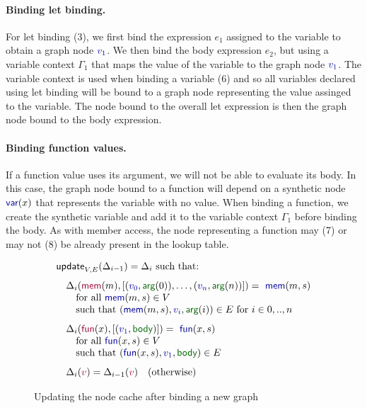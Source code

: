 \documentclass[sigplan,10pt,review,anonymous]{acmart}\settopmatter{printfolios=true,printccs=false,printacmref=false}
\theoremstyle{plain}
\theoremstyle{definition}
\newcommand{\ident}[1]{\textnormal{\sffamily #1}}
\newcommand{\kvd}[1]{\textnormal{\textcolor{kvdclr}{\sffamily #1}}}
\newcommand{\bndclr}[1]{\textcolor{kvdclr}{#1}}
\newcommand{\bkndclr}[1]{\textcolor{prepclr}{#1}}
\newcommand{\bnd}[1]{\textnormal{\textcolor{kvdclr}{\sffamily #1}}}
\newcommand{\bknd}[1]{\textnormal{\textcolor{prepclr}{\sffamily #1}}}
\newcommand{\blbl}[1]{\textnormal{\textcolor{numclr}{\sffamily #1}}}
\begin{document}
\paragraph{Binding let binding.} For \kvd{let} binding (3), we first bind the expression $e_1$ assigned
to the variable to obtain a graph node $\bndclr{v_1}$. We then bind the body expression $e_2$,
but using a variable context $\Gamma_1$ that maps the value of the variable to the graph node
$\bndclr{v_1}$. The variable context is used when binding a variable (6) and so all variables 
declared using \kvd{let} binding will be bound to a graph node representing the value assinged 
to the variable. The node bound to the overall \kvd{let} expression is then the graph node bound
to the body expression.

\paragraph{Binding function values.} If a function value uses its argument, we will not be able
to evaluate its body. In this case, the graph node bound to a function will depend on a synthetic
node $\bnd{var}(x)$ that represents the variable with no value. When binding a function, we 
create the synthetic variable and add it to the variable context $\Gamma_1$ before binding the
body. As with member access, the node representing a function may (7) or may not (8) be already 
present in the lookup table.


\begin{figure}[!b]  
\begin{equation*}
\begin{array}{l}
\ident{update}_{V,E}(\Delta_{i-1}) = \Delta_i~\textnormal{such that:}
\\[0.75em]
\quad\Delta_{i}(\bknd{mem}(m), [(\bndclr{v_0},\blbl{arg}(0)),\ldots, (\bndclr{v_n},\blbl{arg}(n))]) = \bnd{mem}(m, s)\\
\quad\quad \textnormal{for all}~\bnd{mem}(m, s) \in V\\
\quad\quad \textnormal{such that}~(\bnd{mem}(m, s), \bndclr{v_i}, \blbl{arg}(i)) \in E~\textnormal{for}~i\in 0,..,n
\\[0.75em]
\quad\Delta_{i}(\bknd{fun}(x), [(\bndclr{v_1},\blbl{body})]) = \bnd{fun}(x, s)\\
\quad\quad \textnormal{for all}~\bnd{fun}(x, s) \in V\\
\quad\quad \textnormal{such that}~(\bnd{fun}(x, s), \bndclr{v_1}, \blbl{body}) \in E
\\[0.75em]
\quad\Delta_{i}(\bkndclr{v}) = \Delta_{i-1}(\bkndclr{v})\quad \textnormal{(otherwise)}
\end{array}
\end{equation*}
\caption{Updating the node cache after binding a new graph}
\label{fig:loop}
\vspace{0.5em}
\end{figure}
\end{document}
